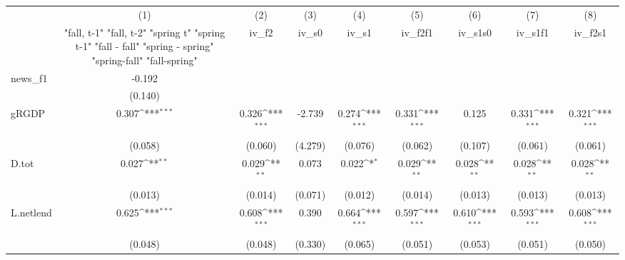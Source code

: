 {
\def\sym#1{\ifmmode^{#1}\else\(^{#1}\)\fi}
\begin{tabular}{l*{8}{c}}
\toprule
            &\multicolumn{1}{c}{(1)}&\multicolumn{1}{c}{(2)}&\multicolumn{1}{c}{(3)}&\multicolumn{1}{c}{(4)}&\multicolumn{1}{c}{(5)}&\multicolumn{1}{c}{(6)}&\multicolumn{1}{c}{(7)}&\multicolumn{1}{c}{(8)}\\
            &\multicolumn{1}{c}{  "fall, t-1" "fall, t-2" "spring t" "spring t-1"  "fall - fall" "spring - spring" "spring-fall" "fall-spring" }&\multicolumn{1}{c}{iv\_f2}&\multicolumn{1}{c}{iv\_s0}&\multicolumn{1}{c}{iv\_s1}&\multicolumn{1}{c}{iv\_f2f1}&\multicolumn{1}{c}{iv\_s1s0}&\multicolumn{1}{c}{iv\_s1f1}&\multicolumn{1}{c}{iv\_f2s1}\\
\midrule
news\_f1     &      -0.192         &                     &                     &                     &                     &                     &                     &                     \\
            &     (0.140)         &                     &                     &                     &                     &                     &                     &                     \\
\addlinespace
gRGDP       &       0.307\sym{***}&       0.326\sym{***}&      -2.739         &       0.274\sym{***}&       0.331\sym{***}&       0.125         &       0.331\sym{***}&       0.321\sym{***}\\
            &     (0.058)         &     (0.060)         &     (4.279)         &     (0.076)         &     (0.062)         &     (0.107)         &     (0.061)         &     (0.061)         \\
\addlinespace
D.tot       &       0.027\sym{**} &       0.029\sym{**} &       0.073         &       0.022\sym{*}  &       0.029\sym{**} &       0.028\sym{**} &       0.028\sym{**} &       0.028\sym{**} \\
            &     (0.013)         &     (0.014)         &     (0.071)         &     (0.012)         &     (0.014)         &     (0.013)         &     (0.013)         &     (0.013)         \\
\addlinespace
L.netlend   &       0.625\sym{***}&       0.608\sym{***}&       0.390         &       0.664\sym{***}&       0.597\sym{***}&       0.610\sym{***}&       0.593\sym{***}&       0.608\sym{***}\\
            &     (0.048)         &     (0.048)         &     (0.330)         &     (0.065)         &     (0.051)         &     (0.053)         &     (0.051)         &     (0.050)         \\

\end{tabular}}
